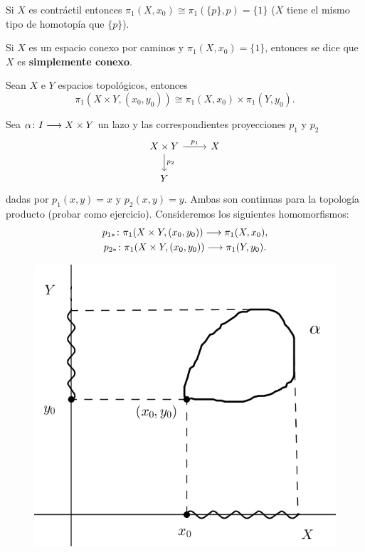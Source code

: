 \documentclass[GTS.tex]{subfiles}
\begin{document}
\begin{coro}
Si $X$ es contráctil entonces $\pi_1(X,x_0)\cong\pi_1(\{p\},p)=\{1\}$ ($X$ tiene el mismo tipo de homotopía que $\{p\}$).
\end{coro}

\begin{defi} Si $X$ es un espacio conexo por caminos y $\pi_1(X,x_0)=\{1\}$, entonces se dice que $X$ es \textbf{simplemente conexo}.
\end{defi}

\begin{prop} Sean $X$ e $Y$ espacios topológicos, entonces
\[
\pi_1(X\times Y, (x_0,y_0))\cong\pi_1(X,x_0)\times\pi_1(Y,y_0).
\]
\end{prop}
\begin{dem}
Sea $\alpha\colon{I}\longrightarrow{X\times Y}$ un lazo y las correspondientes proyecciones $p_1$ y $p_2$
\[
\begin{tikzcd}
X\times Y \ar[r, "p_1"]\ar[d, "p_2"] & X\\
Y
\end{tikzcd}
\]
dadas por $p_1(x,y)=x$ y $p_2(x,y)=y$. Ambas son continuas para la topología producto (probar como ejercicio). Consideremos los siguientes homomorfismos:
\begin{gather*}
p_{1*}\colon{\pi_1(X\times Y, (x_0,y_0))}\longrightarrow{\pi_1(X,x_0)},\\
p_{2*}\colon{\pi_1(X\times Y, (x_0,y_0))}\longrightarrow{\pi_1(Y,y_0)}.
\end{gather*}

\begin{figure}[h!]
	\includegraphics[scale=0.35]{proy}
\end{figure}


\end{dem}
\end{document}

